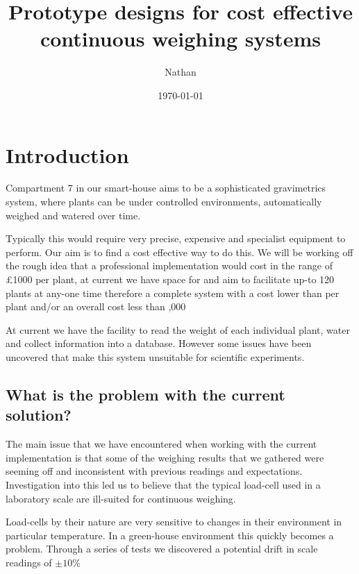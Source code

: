 \documentclass[11pt]{article}
\author{Nathan}
\date{\today}
\title{Prototype designs for cost effective continuous weighing systems}
\begin{document}
\maketitle
\clearpage 
\tableofcontents
\clearpage

\section{Introduction}
Compartment 7 in our smart-house aims to be a sophisticated gravimetrics system, where plants can be under controlled
environments, automatically weighed and watered over time.

\par

Typically this would require very precise, expensive and specialist equipment to perform. Our aim is to find a
cost effective way to do this. We will be working off the rough idea that a professional implementation would cost in the
range of \pounds1000 per plant, at current we have space for and aim to facilitate up-to 120 plants at any-one time therefore a
complete system with a cost lower than  per plant and/or an overall cost less than ,000

\par

At current we have the facility to read the weight of each individual plant, water and collect information into a
database. However some issues have been uncovered that make this system unsuitable for scientific experiments.
\subsection{What is the problem with the current solution?}
The main issue that we have encountered when working with the current implementation is that some
of the weighing results that we gathered were seeming off and inconsistent with previous readings
and expectations. Investigation into this led us to believe that the typical load-cell used in a
laboratory scale are ill-suited for continuous weighing.

\par

Load-cells by their nature are very sensitive to changes in their environment in particular temperature.
In a green-house environment this quickly becomes a problem. Through a series of tests we discovered a
potential drift in scale readings of \(\pm10\%\)
\end{document}
